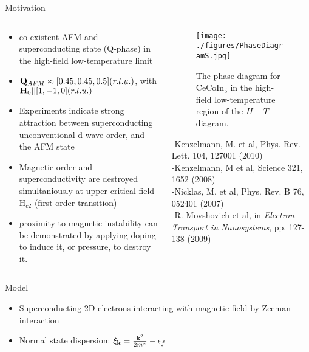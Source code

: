 \documentclass{beamer} %
\begin{document}
\begin{frame}{}
\begin{columns}[t]
\begin{column}{.4\textwidth}
\begin{block}{\centering\Huge Motivation}
						
			\begin{columns}[t]
				\begin{column}{0.47\textwidth}
				\vspace{1cm}
				\begin{itemize}
					\item{co-existent AFM and superconducting state (Q-phase) in the high-field low-temperature limit} 
					\item{${\bf Q}_{AFM} \approx [0.45, 0.45, 0.5] (r.l.u.) $, with ${\bf H}_0 || [1,-1,0](r.l.u.)$}
					\item{Experiments indicate strong attraction between superconducting unconventional d-wave order, and the AFM state}
					\item{Magnetic order and superconductivity are destroyed simultaniously at upper critical field H$_{c2}$ (first order transition)}
					\item{proximity to magnetic instability can be demonstrated by applying doping to induce it, or pressure, to destroy it.}
				\end{itemize}
				\end{column}
				\begin{column}{0.53\textwidth}
					\begin{figure}
					\texttt{[image: ./figures/PhaseDiagramS.jpg]}
					\caption{The phase diagram for CeCoIn$_5$ in the high-field low-temperature region of the $H-T$ diagram.
					\label{fig:cecoin5}}
					\end{figure}
					{ \small -Kenzelmann, M. et al, Phys. Rev. Lett. 104, 127001 (2010) \\
					-Kenzelmann, M et al, Science 321, 1652 (2008) \\
					-Nicklas, M. et al, Phys. Rev. B 76, 052401 (2007) \\
					-R. Movshovich et al, in \emph{Electron Transport in Nanosystems}, pp. 127-138 (2009)}
				\end{column}
			\end{columns}
		\end{block}
		\begin{block}{\centering\veryHuge Model}
			\begin{itemize}
			\item{Superconducting 2D electrons interacting with magnetic field by Zeeman interaction}
			\item{Normal state dispersion: $\xi_{{\bf k}}=\frac{{\bf k}^2}{2m^*}-\epsilon_f$}

\end{itemize}
\end{block}
\end{column}
\end{columns}
\end{frame}
\end{document}
